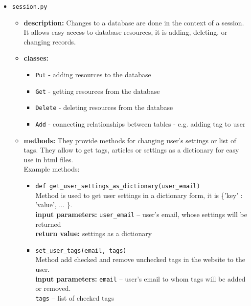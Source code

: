 \documentclass[12pt]{article}
\begin{document}
\begin{itemize}
	\item \texttt{session.py}
	\begin{itemize}
		\item \textbf{description:} Changes to a database are done in the context of a session. It allows easy access to database resources, it is adding, deleting, or changing records.
		\item \textbf{classes:} 
		\begin{itemize}
			\item \texttt{Put} - adding resources to the database
			\item \texttt{Get} - getting resources from the database 
			\item \texttt{Delete} - deleting resources from the database
			\item \texttt{Add} - connecting relationships between tables - e.g. adding tag to user
		\end{itemize}
		\item \textbf{methods:} They provide methods for changing user's settings or list of tags. They allow to get tags, articles or settings as a dictionary for easy use in html files. \\
		Example methods:
		\begin{itemize}
			\item \texttt{def get\_user\_settings\_as\_dictionary(user\_email)} \\
			Method is used to get user settings in a dictionary form, it is \{'key' : 'value', ... \}. \\
			\textbf{input parameters:} \texttt{user\_email} -- user's email, whose settings will be returned \\
			\textbf{return value:} settings as a dictionary
			
			\item \texttt{set\_user\_tags(email, tags)} \\
			Method add checked and remove unchecked tags in the website to the user. \\
			\textbf{input parameters:} \texttt{email} -- user's email to whom tags will be added or removed. \\
			\texttt{tags} -- list of checked tags
			
		\end{itemize}
	\end{itemize}
	
\end{itemize}


\vspace{0.5cm}
\end{document}

